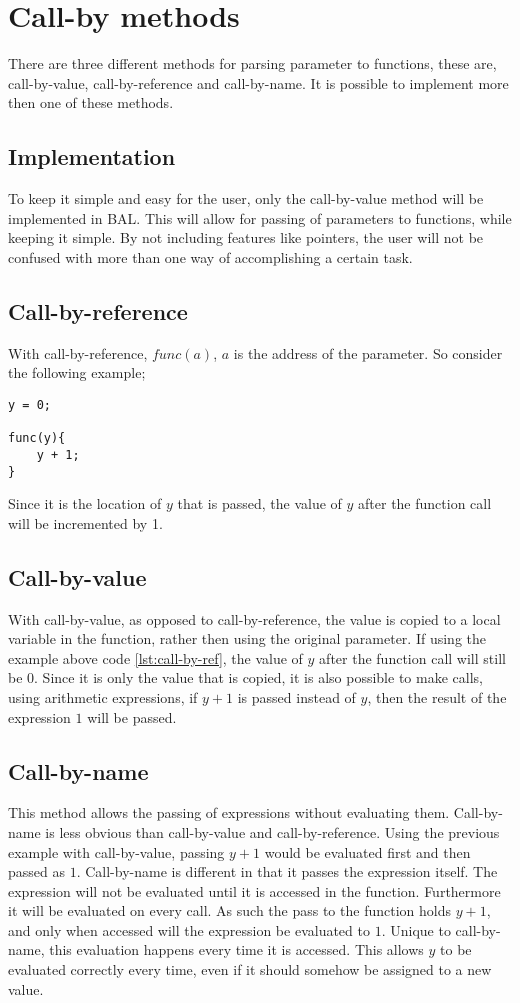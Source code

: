 \section{Call-by methods}
There are three different methods for parsing parameter to functions, these are, call-by-value, call-by-reference and call-by-name. It is possible to implement more then one of these methods.

\subsection*{Implementation}To keep it simple and easy for the user, only the call-by-value method will be implemented in BAL. This will allow for passing of parameters to functions, while keeping it simple. By not including features like pointers, the user will not be confused with more than one way of accomplishing a certain task.

\subsection*{Call-by-reference}
With call-by-reference, $func(a)$, $a$ is the address of the parameter. So consider the following example;
\begin{lstlisting}[caption=call-by-reference example, label=lst:call-by-ref]
y = 0;

func(y){
	y + 1;
}
\end{lstlisting}
Since it is the location of $y$ that is passed, the value of $y$ after the function call will be incremented by 1.
\subsection*{Call-by-value}
With call-by-value, as opposed to call-by-reference, the value is copied to a local variable in the function, rather then using the original parameter. If using the example above code \ref{lst:call-by-ref}, the value of $y$ after the function call will still be $0$. Since it is only the value that  is copied, it is also possible to make calls, using arithmetic expressions, if $y+1$ is passed instead of $y$, then the result of the expression $1$ will be passed.
\subsection*{Call-by-name}
This method allows the passing of expressions without evaluating them. Call-by-name is less obvious than call-by-value and call-by-reference. Using the previous example with call-by-value, passing $y+1$ would be evaluated first and then passed as $1$. Call-by-name is different in that it passes the expression itself. The expression will not be evaluated until it is accessed in the function. Furthermore it will be evaluated on every call. As such the pass to the function holds $y+1$, and only when accessed will the expression be evaluated to $1$. Unique to call-by-name, this evaluation happens every time it is accessed. This allows $y$ to be evaluated correctly every time, even if it should somehow be assigned to a new value.
